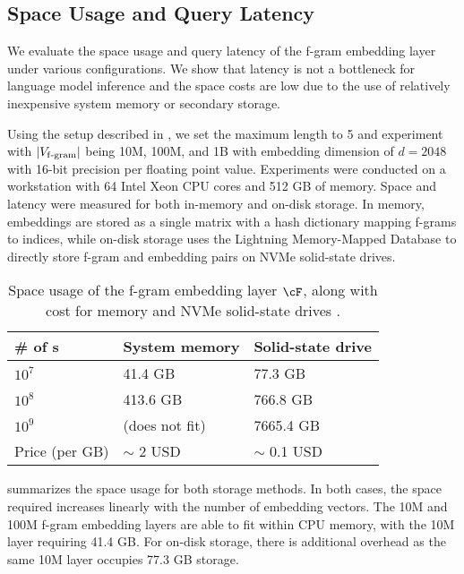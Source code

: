 \subsection{Space Usage and Query Latency}
\label{subsec:inference_cost}

We evaluate the space usage and query latency of the f-gram embedding layer under various configurations.  We show that latency is not a bottleneck for  language model inference and the space costs are low due to the use of relatively inexpensive system memory or secondary storage.

Using the setup described in , we set the maximum  length to 5 and experiment with $|V_{\mathrm{f\text{-}gram}}|$ being 10M, 100M, and 1B with embedding dimension of $d = 2048$ with 16-bit precision per floating point value. Experiments were conducted on a workstation with 64 Intel Xeon CPU cores and 512 GB of memory. Space and latency were measured for both in-memory and on-disk storage. In memory, embeddings are stored as a single matrix with a hash dictionary mapping f-grams to indices, while on-disk storage uses the Lightning Memory-Mapped Database \citep{lmdb} to directly store f-gram and embedding pairs on NVMe solid-state drives.


\begin{table} [h]
    \caption{Space usage of the f-gram embedding layer $\cF$, along with cost for memory and NVMe solid-state drives \citep{memory_disk_price}.}
\label{tbl:space}
\centering
\small
\renewcommand{\arraystretch}{1.85}
\begin{tabular}{ P{2.0cm}|P{2.4cm} | P{2.4cm} }
 \hline \hline
  \# of s       & System memory & Solid-state drive 		 \\\hline
$10^{7}$    &   41.4 GB  &	  77.3 GB 	\\\hline
$10^{8}$    &   413.6 GB  &  766.8 GB 	\\\hline
$10^{9}$    &   (does not fit)  &	7665.4 GB 	\\\hline\hline

Price (per GB) & $\sim$ 2 USD  & $\sim$ 0.1 USD  \\\hline \hline
\end{tabular} 
\end{table}

 summarizes the space usage for both storage methods. In both cases, the space required increases linearly with the number of embedding vectors. 
The 10M and 100M f-gram embedding layers are able to fit within CPU memory, with the 10M layer requiring 41.4 GB. For on-disk storage, there is additional overhead as the same 10M layer occupies 77.3 GB storage.


